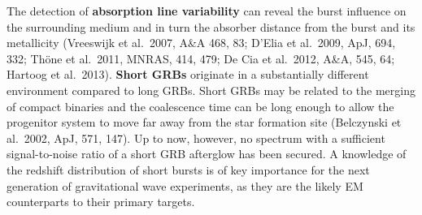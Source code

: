 The detection of {\bf absorption line variability} can reveal the burst
influence on the surrounding medium and in turn the absorber distance from the
burst and its metallicity (Vreeswijk et al.\ 2007, A\&A 468, 83; D'Elia et al.\
2009, ApJ, 694, 332; Th\"one et al.\ 2011, MNRAS, 414, 479; De Cia et al.\
2012, A\&A, 545, 64; Hartoog et al.\ 2013).
{\bf Short GRBs} originate in a substantially different
environment compared to long GRBs. Short GRBs may be related to the merging of
compact binaries and the coalescence time can be long enough to allow the
progenitor system to move far away from the star formation site (Belczynski et
al.\ 2002, ApJ, 571, 147). Up to now, however, no spectrum with a sufficient 
signal-to-noise ratio
of a short GRB afterglow has been secured.
A knowledge of the redshift distribution
of short bursts is of key importance for the next generation of gravitational
wave experiments, as they are the likely EM counterparts to their
primary targets.

